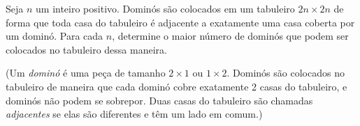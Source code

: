 Seja $n$ um inteiro positivo.
Dominós são colocados em um tabuleiro $2n \times 2n$ de forma que toda casa do tabuleiro é adjacente a exatamente uma casa coberta por um dominó.
Para cada $n$, determine o maior número de dominós que podem ser colocados no tabuleiro dessa maneira.

(Um \textit{dominó} é uma peça de tamanho $2 \times 1$ ou $1 \times 2$.
Dominós são colocados no tabuleiro de maneira que cada dominó cobre exatamente 2 casas do tabuleiro, e dominós não podem se sobrepor.
Duas casas do tabuleiro são chamadas \textit{adjacentes} se elas são diferentes e têm um lado em comum.)
